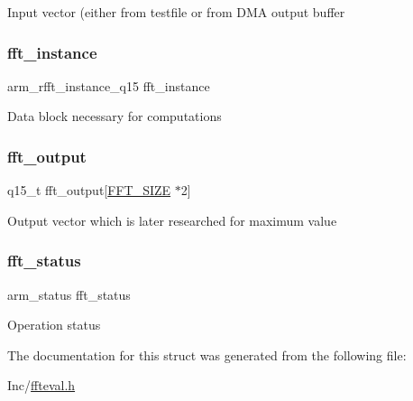 Input vector (either from testfile or from D\+MA output buffer \mbox{\label{struct_f_f_t___handle_type_def_a64ff6ded404718f6b0734ec3cb38c3a4}} 
\subsubsection{\texorpdfstring{fft\_instance}{fft\_instance}}
{\footnotesize\ttfamily arm\+\_\+rfft\+\_\+instance\+\_\+q15 fft\+\_\+instance}

Data block necessary for computations \mbox{\label{struct_f_f_t___handle_type_def_a4df5ed415a14ec57648a1be3631fa492}} 
\subsubsection{\texorpdfstring{fft\_output}{fft\_output}}
{\footnotesize\ttfamily q15\+\_\+t fft\+\_\+output\mbox{[}\mbox{\hyperlink{ffteval_8h_a636ddc19af00bc87969a07c88331f105}{F\+F\+T\+\_\+\+S\+I\+ZE}} $\ast$2\mbox{]}}

Output vector which is later researched for maximum value \mbox{\label{struct_f_f_t___handle_type_def_ab9552d91d6391e1b36e767bf5c127bb8}} 
\subsubsection{\texorpdfstring{fft\_status}{fft\_status}}
{\footnotesize\ttfamily arm\+\_\+status fft\+\_\+status}

Operation status 

The documentation for this struct was generated from the following file\+:\begin{DoxyCompactItemize}
\item 
Inc/\mbox{\hyperlink{ffteval_8h}{ffteval.\+h}}\end{DoxyCompactItemize}
